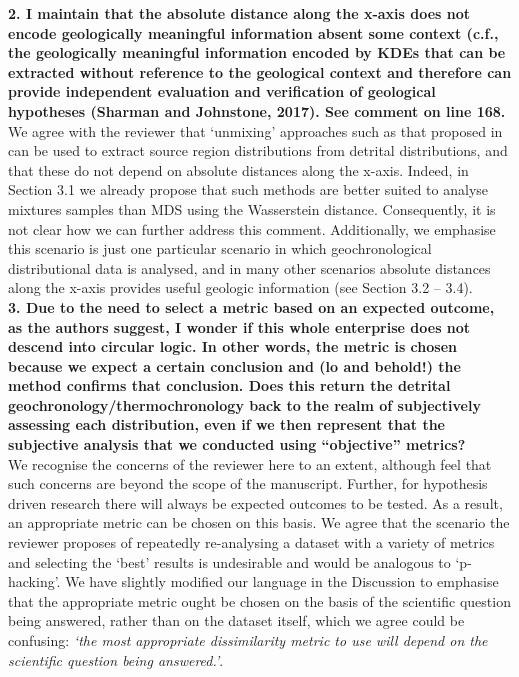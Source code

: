 \documentclass{article}[12p,a4paper]
\begin{document}
\textbf{2. I maintain that the absolute distance along the x-axis does not encode geologically meaningful information absent some context (c.f., the geologically meaningful information encoded by KDEs that can be extracted without reference to the geological context and therefore can provide independent evaluation and verification of geological hypotheses (Sharman and Johnstone, 2017). See comment on line 168.}\\ 

We agree with the reviewer that `unmixing' approaches such as that proposed in \textcite{sharman_sediment_2017} can be used to extract source region distributions from detrital distributions, and that these do not depend on absolute distances along the x-axis. Indeed, in Section 3.1 we already propose that such methods are better suited to analyse mixtures samples than MDS using the Wasserstein distance. Consequently, it is not clear how we can further address this comment. Additionally, we emphasise this scenario is just one particular scenario in which geochronological distributional data is analysed, and in many other scenarios absolute distances along the x-axis provides useful geologic information (see Section 3.2 -- 3.4).\\  

\textbf{3. Due to the need to select a metric based on an expected outcome, as the authors suggest, I wonder if this whole enterprise does not descend into circular logic. In other words, the metric is chosen because we expect a certain conclusion and (lo and behold!) the method confirms that conclusion. Does this return the detrital geochronology/thermochronology back to the realm of subjectively assessing each distribution, even if we then represent that the subjective analysis that we conducted using “objective” metrics?}\\

We recognise the concerns of the reviewer here to an extent, although feel that such concerns are beyond the scope of the manuscript. Further, for hypothesis driven research there will always be expected outcomes to be tested. As a result, an appropriate metric can be chosen on this basis. We agree that the scenario the reviewer proposes of repeatedly re-analysing a dataset with a variety of metrics and selecting the `best' results is undesirable and would be analogous to `p-hacking'. We have slightly modified our language in the Discussion to emphasise that the appropriate metric ought be chosen on the basis of the scientific question being answered, rather than on the dataset itself, which we agree could be confusing: \textit{`the most appropriate dissimilarity metric to use will depend on the scientific question being answered.'}.\\
\end{document}

